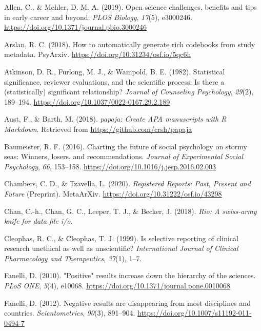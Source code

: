 \documentclass[british,,jou,floatsintext]{apa6}
\begin{document}
\leavevmode\hypertarget{ref-Allen2019}{}%
Allen, C., \& Mehler, D. M. A. (2019). Open science challenges, benefits and tips in early career and beyond. \emph{PLOS Biology}, \emph{17}(5), e3000246. \url{https://doi.org/10.1371/journal.pbio.3000246}

\leavevmode\hypertarget{ref-R-codebook}{}%
Arslan, R. C. (2018). How to automatically generate rich codebooks from study metadata. PsyArxiv. \url{https://doi.org/10.31234/osf.io/5qc6h}

\leavevmode\hypertarget{ref-Atkinson1982}{}%
Atkinson, D. R., Furlong, M. J., \& Wampold, B. E. (1982). Statistical significance, reviewer evaluations, and the scientific process: Is there a (statistically) significant relationship? \emph{Journal of Counseling Psychology}, \emph{29}(2), 189--194. \url{https://doi.org/10.1037/0022-0167.29.2.189}

\leavevmode\hypertarget{ref-R-papaja}{}%
Aust, F., \& Barth, M. (2018). \emph{papaja: Create APA manuscripts with R Markdown}. Retrieved from \url{https://github.com/crsh/papaja}

\leavevmode\hypertarget{ref-Baumeister2016}{}%
Baumeister, R. F. (2016). Charting the future of social psychology on stormy seas: Winners, losers, and recommendations. \emph{Journal of Experimental Social Psychology}, \emph{66}, 153--158. \url{https://doi.org/10.1016/j.jesp.2016.02.003}

\leavevmode\hypertarget{ref-Chambers2020}{}%
Chambers, C. D., \& Tzavella, L. (2020). \emph{Registered Reports: Past, Present and Future} (Preprint). MetaArXiv. \url{https://doi.org/10.31222/osf.io/43298}

\leavevmode\hypertarget{ref-R-rio}{}%
Chan, C.-h., Chan, G. C., Leeper, T. J., \& Becker, J. (2018). \emph{Rio: A swiss-army knife for data file i/o}.

\leavevmode\hypertarget{ref-Cleophas1999}{}%
Cleophas, R. C., \& Cleophas, T. J. (1999). Is selective reporting of clinical research unethical as well as unscientific? \emph{International Journal of Clinical Pharmacology and Therapeutics}, \emph{37}(1), 1--7.

\leavevmode\hypertarget{ref-Fanelli2010}{}%
Fanelli, D. (2010). "Positive" results increase down the hierarchy of the sciences. \emph{PLoS ONE}, \emph{5}(4), e10068. \url{https://doi.org/10.1371/journal.pone.0010068}

\leavevmode\hypertarget{ref-Fanelli2012}{}%
Fanelli, D. (2012). Negative results are disappearing from most disciplines and countries. \emph{Scientometrics}, \emph{90}(3), 891--904. \url{https://doi.org/10.1007/s11192-011-0494-7}
\end{document}
